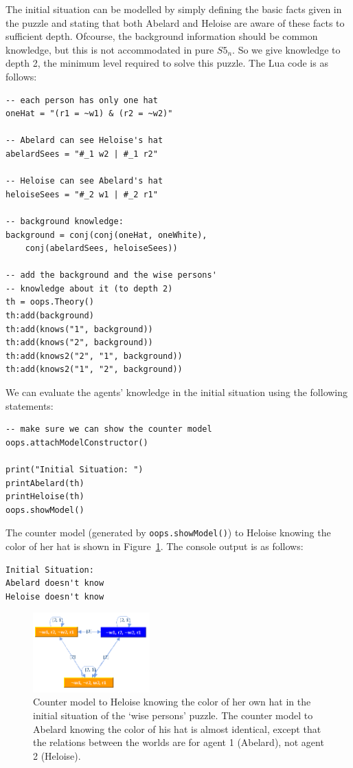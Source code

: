 The initial situation can be modelled by simply defining the basic facts given in the puzzle and stating that both Abelard and Heloise are aware of these facts to sufficient depth.
Ofcourse, the background information should be common knowledge, but this is not accommodated in pure $S5_n$.
So we give knowledge to depth 2, the minimum level required to solve this puzzle.
The Lua code is as follows:
\begin{lstlisting}
-- each person has only one hat
oneHat = "(r1 = ~w1) & (r2 = ~w2)"

-- Abelard can see Heloise's hat
abelardSees = "#_1 w2 | #_1 r2"

-- Heloise can see Abelard's hat
heloiseSees = "#_2 w1 | #_2 r1"

-- background knowledge:
background = conj(conj(oneHat, oneWhite),
    conj(abelardSees, heloiseSees))

-- add the background and the wise persons'
-- knowledge about it (to depth 2)
th = oops.Theory()
th:add(background)
th:add(knows("1", background))
th:add(knows("2", background))
th:add(knows2("2", "1", background))
th:add(knows2("1", "2", background))
\end{lstlisting}
We can evaluate the agents' knowledge in the initial situation using the following statements:
\begin{lstlisting}
-- make sure we can show the counter model
oops.attachModelConstructor()

print("Initial Situation: ")
printAbelard(th)
printHeloise(th)
oops.showModel()
\end{lstlisting}
The counter model (generated by {\tt oops.showModel()}) to Heloise knowing the color of her hat is shown in Figure~\ref{fig:output1}. The console output is as follows:
\begin{verbatim}
Initial Situation:
Abelard doesn't know
Heloise doesn't know
\end{verbatim}

\begin{figure}
\centering
\includegraphics[width=0.4\textwidth]{images/demo04}
\caption{Counter model to Heloise knowing the color of her own hat in the initial situation of the `wise persons' puzzle. The counter model to Abelard knowing the color of his hat is almost identical, except that the relations between the worlds are for agent 1 (Abelard), not agent 2 (Heloise).}
\label{fig:output1}
\end{figure}

